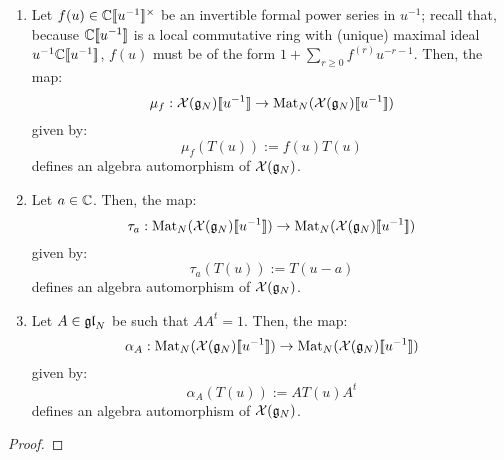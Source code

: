             \begin{lemma} \label{lemma: automorphisms_of_extended_untwisted_yangians}
                \begin{enumerate}
                    \item Let $f(u) \in \bbC[\![u^{-1}]\!]^{\x}$ be an invertible formal power series in $u^{-1}$; recall that, because $\mathbb{C}[\![u^{-1}]\!]$ is a local commutative ring with (unique) maximal ideal $u^{-1}\mathbb{C}[\![u^{-1}]\!]$, $f(u)$ must be of the form $1 + \sum_{r \geq 0} f^{(r)} u^{-r - 1}$. Then, the map:
                        $$\mu_f: \mathcal{X}(\mathfrak{g}_N)[\![u^{-1}]\!] \to \mathrm{Mat}_N(\mathcal{X}(\mathfrak{g}_N)[\![u^{-1}]\!])$$
                    given by:
                        $$\mu_f( T(u) ) := f(u) T(u)$$
                    defines an algebra automorphism of $\mathcal{X}(\mathfrak{g}_N)$.
                    \item Let $a \in \mathbb{C}$. Then, the map:
                        $$\tau_a: \mathrm{Mat}_N(\mathcal{X}(\mathfrak{g}_N)[\![u^{-1}]\!]) \to \mathrm{Mat}_N(\mathcal{X}(\mathfrak{g}_N)[\![u^{-1}]\!])$$
                    given by:
                        $$\tau_a( T(u) ) := T(u - a)$$
                    defines an algebra automorphism of $\mathcal{X}(\mathfrak{g}_N)$.
                    \item Let $A \in \mathfrak{gl}_N$ be such that $AA^t = 1$. Then, the map:
                        $$\alpha_A: \mathrm{Mat}_N(\mathcal{X}(\mathfrak{g}_N)[\![u^{-1}]\!]) \to \mathrm{Mat}_N(\mathcal{X}(\mathfrak{g}_N)[\![u^{-1}]\!])$$
                    given by:
                        $$\alpha_A( T(u) ) := A T(u) A^t$$
                    defines an algebra automorphism of $\mathcal{X}(\mathfrak{g}_N)$.
                \end{enumerate}
            \end{lemma}
                \begin{proof}
                    
                \end{proof}

